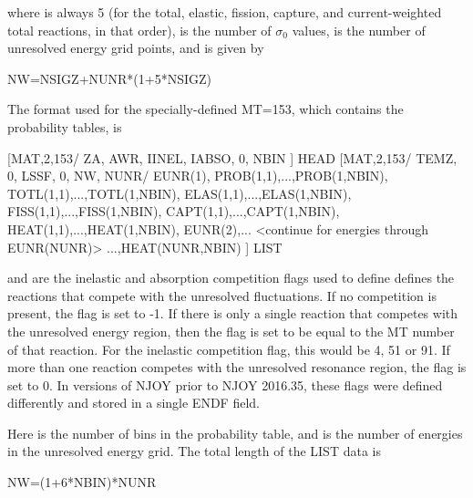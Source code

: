 \noindent
where  is always 5 (for the total, elastic,
fission, capture, and current-weighted total reactions, in that order),
 is the number of $\sigma_0$ values,  is
the number of unresolved energy grid points, and  is
given by

\newpage
\small
\begin{ccode}

   NW=NSIGZ+NUNR*(1+5*NSIGZ)

\end{ccode}
\normalsize

The format used for the specially-defined MT=153, which contains the
probability tables, is

\small
\begin{ccode}

[MAT,2,153/ ZA, AWR, IINEL, IABSO, 0, NBIN ] HEAD
[MAT,2,153/ TEMZ, 0, LSSF, 0, NW, NUNR/
            EUNR(1),
            PROB(1,1),...,PROB(1,NBIN),
            TOTL(1,1),...,TOTL(1,NBIN),
            ELAS(1,1),...,ELAS(1,NBIN),
            FISS(1,1),...,FISS(1,NBIN),
            CAPT(1,1),...,CAPT(1,NBIN),
            HEAT(1,1),...,HEAT(1,NBIN),
            EUNR(2),...
              <continue for energies through EUNR(NUNR)>
            ...,HEAT(NUNR,NBIN) ] LIST

\end{ccode}
\normalsize

\noindent
{} and  are the inelastic and absorption competition flags used
to define defines the reactions that compete with the unresolved fluctuations. If no
competition is present, the flag is set to -1. If there is only a single reaction that
competes with the unresolved energy region, then the flag is set to be equal to the MT
number of that reaction. For the inelastic competition flag, this would be 4, 51 or 91.
If more than one reaction competes with the unresolved resonance region, the flag is set
to 0. In versions of NJOY prior to NJOY 2016.35, these flags were defined differently and
stored in a single ENDF field.

\noindent
Here  is the number of bins in the probability table, and
 is the number of energies in the unresolved energy grid.
The total length of the LIST data is

\small
\begin{ccode}

  NW=(1+6*NBIN)*NUNR

\end{ccode}
\normalsize

